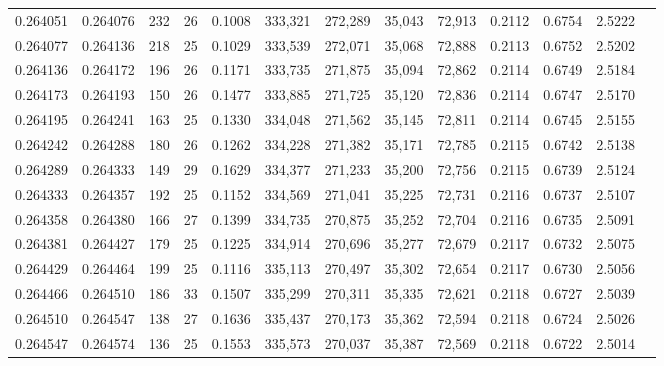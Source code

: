 \begin{tabular}{rrrrrrrrrrrrr}
0.264051 & 0.264076 &   232 &  26 &                                     0.1008 & 333,321 & 272,289 &  35,043 &  72,913 & 0.2112 & 0.6754 & 2.5222 \\
0.264077 & 0.264136 &   218 &  25 &                                     0.1029 & 333,539 & 272,071 &  35,068 &  72,888 & 0.2113 & 0.6752 & 2.5202 \\
0.264136 & 0.264172 &   196 &  26 &                                     0.1171 & 333,735 & 271,875 &  35,094 &  72,862 & 0.2114 & 0.6749 & 2.5184 \\
0.264173 & 0.264193 &   150 &  26 &                                     0.1477 & 333,885 & 271,725 &  35,120 &  72,836 & 0.2114 & 0.6747 & 2.5170 \\
0.264195 & 0.264241 &   163 &  25 &                                     0.1330 & 334,048 & 271,562 &  35,145 &  72,811 & 0.2114 & 0.6745 & 2.5155 \\
0.264242 & 0.264288 &   180 &  26 &                                     0.1262 & 334,228 & 271,382 &  35,171 &  72,785 & 0.2115 & 0.6742 & 2.5138 \\
0.264289 & 0.264333 &   149 &  29 &                                     0.1629 & 334,377 & 271,233 &  35,200 &  72,756 & 0.2115 & 0.6739 & 2.5124 \\
0.264333 & 0.264357 &   192 &  25 &                                     0.1152 & 334,569 & 271,041 &  35,225 &  72,731 & 0.2116 & 0.6737 & 2.5107 \\
0.264358 & 0.264380 &   166 &  27 &                                     0.1399 & 334,735 & 270,875 &  35,252 &  72,704 & 0.2116 & 0.6735 & 2.5091 \\
0.264381 & 0.264427 &   179 &  25 &                                     0.1225 & 334,914 & 270,696 &  35,277 &  72,679 & 0.2117 & 0.6732 & 2.5075 \\
0.264429 & 0.264464 &   199 &  25 &                                     0.1116 & 335,113 & 270,497 &  35,302 &  72,654 & 0.2117 & 0.6730 & 2.5056 \\
0.264466 & 0.264510 &   186 &  33 &                                     0.1507 & 335,299 & 270,311 &  35,335 &  72,621 & 0.2118 & 0.6727 & 2.5039 \\
0.264510 & 0.264547 &   138 &  27 &                                     0.1636 & 335,437 & 270,173 &  35,362 &  72,594 & 0.2118 & 0.6724 & 2.5026 \\
0.264547 & 0.264574 &   136 &  25 &                                     0.1553 & 335,573 & 270,037 &  35,387 &  72,569 & 0.2118 & 0.6722 & 2.5014 \\

\end{tabular}
